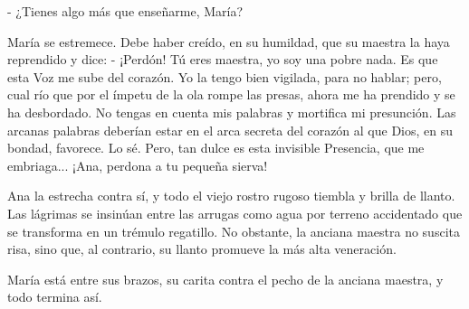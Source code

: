 \documentclass[12pt, twoside, openright]{book} %
\begin{document}
- ¿Tienes algo más que enseñarme, María? 

María se estremece. Debe haber creído, en su humildad, que su maestra la haya reprendido y dice: - ¡Perdón! Tú eres maestra, yo soy una pobre nada. Es que esta Voz me sube del corazón. Yo la tengo bien vigilada, para no hablar; pero, cual río que por el ímpetu de la ola rompe las presas, ahora me ha prendido y se ha desbordado. No tengas en cuenta mis palabras y mortifica mi presunción. Las arcanas palabras deberían estar en el arca secreta del corazón al que Dios, en su bondad, favorece. Lo sé. Pero, tan dulce es esta invisible Presencia, que me embriaga... ¡Ana, perdona a tu pequeña sierva! 

Ana la estrecha contra sí, y todo el viejo rostro rugoso tiembla y brilla de llanto. Las lágrimas se insinúan entre las arrugas como agua por terreno accidentado que se transforma en un trémulo regatillo. No obstante, la anciana maestra no suscita risa, sino que, al contrario, su llanto promueve la más alta veneración. 

María está entre sus brazos, su carita contra el pecho de la anciana maestra, y todo termina así. 
\end{document}
